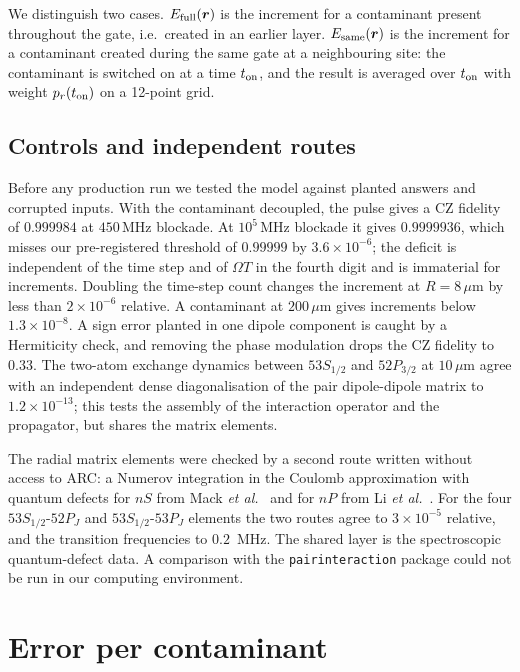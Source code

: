 \documentclass[aps,pra,twocolumn,superscriptaddress,longbibliography,floatfix]{revtex4-2}
\newcommand{\um}{\,\mu\mathrm{m}}
\newcommand{\MHz}{\,\mathrm{MHz}}
\begin{document}
We distinguish two cases. $E_{\rm full}(\bm r)$ is the increment for a contaminant present throughout the gate, i.e.\ created in an earlier layer. $E_{\rm same}(\bm r)$ is the increment for a contaminant created during the same gate at a neighbouring site: the contaminant is switched on at a time $t_{\rm on}$, and the result is averaged over $t_{\rm on}$ with weight $p_r(t_{\rm on})$ on a 12-point grid.

\subsection{Controls and independent routes}

Before any production run we tested the model against planted answers and corrupted inputs. With the contaminant decoupled, the pulse gives a CZ fidelity of $0.999984$ at $450\MHz$ blockade. At $10^5\MHz$ blockade it gives $0.9999936$, which misses our pre-registered threshold of $0.99999$ by $3.6\times10^{-6}$; the deficit is independent of the time step and of $\Omega T$ in the fourth digit and is immaterial for increments. Doubling the time-step count changes the increment at $R=8\um$ by less than $2\times10^{-6}$ relative. A contaminant at $200\um$ gives increments below $1.3\times10^{-8}$. A sign error planted in one dipole component is caught by a Hermiticity check, and removing the phase modulation drops the CZ fidelity to $0.33$. The two-atom exchange dynamics between $53S_{1/2}$ and $52P_{3/2}$ at $10\um$ agree with an independent dense diagonalisation of the pair dipole-dipole matrix to $1.2\times10^{-13}$; this tests the assembly of the interaction operator and the propagator, but shares the matrix elements.

The radial matrix elements were checked by a second route written without access to ARC: a Numerov integration in the Coulomb approximation with quantum defects for $nS$ from Mack \textit{et al.}\ \cite{Mack2011} and for $nP$ from Li \textit{et al.}\ \cite{Li2003}. For the four $53S_{1/2}$-$52P_J$ and $53S_{1/2}$-$53P_J$ elements the two routes agree to $3\times10^{-5}$ relative, and the transition frequencies to $0.2$~MHz. The shared layer is the spectroscopic quantum-defect data. A comparison with the \texttt{pairinteraction} package could not be run in our computing environment.

\section{Error per contaminant}
\label{sec:map}
\end{document}
